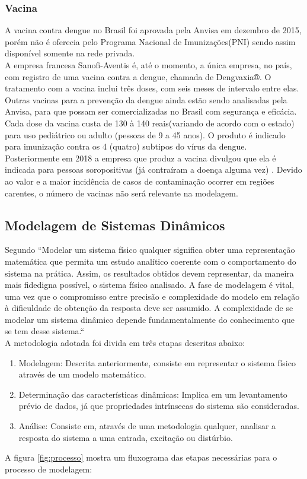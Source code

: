 \documentclass[conference]{IEEEtran}
\begin{document}
\subsubsection{Vacina}
A vacina contra dengue no Brasil foi aprovada pela Anvisa em dezembro de 2015, porém não é oferecia pelo Programa Nacional de Imunizações(PNI) sendo assim disponível somente na rede privada. \\ 
A empresa francesa Sanofi-Aventis é, até o momento, a única empresa, no país, com registro de uma vacina contra a dengue, chamada de Dengvaxia®. O tratamento com a vacina inclui três doses, com seis meses de intervalo entre elas. Outras vacinas para a prevenção da dengue ainda estão sendo analisadas pela Anvisa, para que possam ser comercializadas no Brasil com segurança e eficácia. Cada dose da vacina custa de 130 à 140 reais(variando de acordo com o estado) para uso pediátrico ou adulto (pessoas de 9 a 45 anos).
\indent O produto é indicado para imunização contra os 4 (quatro) subtipos do vírus da dengue.
Posteriormente em 2018 a empresa que produz a vacina divulgou que ela é indicada para pessoas soropositivas (já contraíram a doença alguma vez) \cite{anvisa}.
Devido ao valor e a maior incidência de casos de contaminação ocorrer em regiões carentes, o número de vacinas não será relevante na modelagem.\\

\subsection{Modelagem de Sistemas Dinâmicos}
Segundo \cite{zambroni} ``Modelar um sistema físico qualquer significa obter uma representação matemática que permita um estudo analítico coerente com o comportamento do sistema na prática. 
Assim, os resultados obtidos devem representar, da maneira mais fidedigna possível, o sistema físico analisado. 
A fase de modelagem é vital, uma vez que o compromisso entre precisão e complexidade do modelo em relação à dificuldade de obtenção da resposta deve ser assumido. A complexidade de se modelar um sistema dinâmico depende fundamentalmente do conhecimento que se tem desse sistema.`` \\
	A metodologia adotada foi divida em três etapas descritas abaixo:
\begin{enumerate}
    \item Modelagem: Descrita anteriormente, consiste em representar o sistema físico através de um modelo matemático.
    \item Determinação das características dinâmicas: Implica em um levantamento prévio de dados, já que propriedades intrínsecas do sistema são consideradas.
    \item Análise: Consiste em, através de uma metodologia qualquer, analisar a resposta do sistema a uma entrada, excitação ou distúrbio.
\end{enumerate}
A figura \ref{fig:processo} mostra um fluxograma das etapas necessárias para o processo de modelagem:
\end{document}
